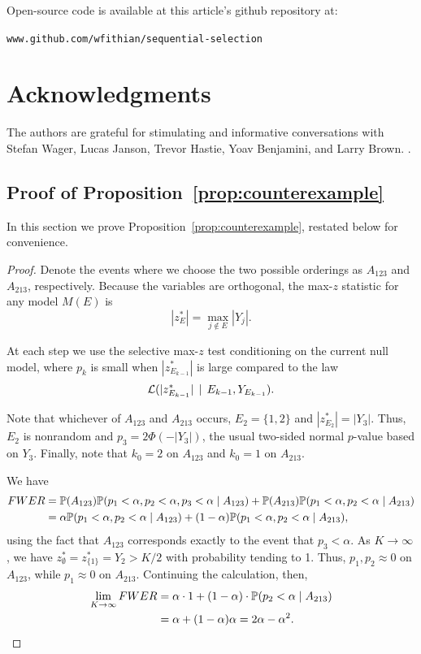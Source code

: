 \documentclass{article}
\begin{document}
Open-source code is available at this article's github repository at:
\begin{center}
\texttt{www.github.com/wfithian/sequential-selection}
\end{center}

\section*{Acknowledgments}

The authors are grateful for stimulating and informative conversations with Stefan Wager, Lucas Janson, Trevor Hastie, Yoav Benjamini, and Larry Brown. .




\newpage

\begin{appendix}

\section{Proof of Proposition~\ref{prop:counterexample}}

In this section we prove Proposition~\ref{prop:counterexample}, restated below for convenience.

\counterex*

\begin{proof}
Denote the events where we choose the two possible orderings as $A_{123}$ and $A_{213}$, respectively. Because the variables are orthogonal, the max-$z$ statistic for any model $M(E)$ is 
\[
|z_E^*|=\max_{j\notin E} |Y_j|.
\]

At each step we use the selective max-$z$ test conditioning on the current null model, where $p_k$ is small when $|z_{E_{k-1}}^*|$ is large compared to the law
\[
\L(|z_{E_{k-1}}^*| \,\mid\, E_{k-1}, Y_{E_{k-1}}).
\]

Note that whichever of $A_{123}$ and $A_{213}$ occurs, $E_2=\{1,2\}$ and $|z_{E_2}^*|=|Y_3|$. Thus, $E_2$ is nonrandom and $p_3=2\Phi(-|Y_3|)$, the usual two-sided normal $p$-value based on $Y_3$. Finally, note that $k_0=2$ on $A_{123}$ and $k_0=1$ on $A_{213}$. 

We have
\begin{align*}
  FWER 
  &= \P(A_{123})\P(p_1<\alpha, p_2<\alpha, p_3<\alpha \mid A_{123})
  + \P(A_{213})\P(p_1<\alpha, p_2<\alpha \mid A_{213})\\
  &= \alpha \P(p_1<\alpha, p_2<\alpha \mid A_{123})
  + (1-\alpha) \P(p_1<\alpha, p_2<\alpha \mid A_{213}),
\end{align*}
using the fact that $A_{123}$ corresponds exactly to the event that $p_3<\alpha$. As $K\to\infty$, we have $z_\emptyset^*=z_{\{1\}}^*=Y_2>K/2$ with probability tending to 1. Thus, $p_1,p_2\approx 0$ on $A_{123}$, while $p_1\approx 0$ on $A_{213}$. Continuing the calculation, then,
\begin{align*}
  \lim_{K\to\infty} FWER 
  &= \alpha\cdot 1 + (1-\alpha)\cdot \P(p_2 < \alpha \mid A_{213})\\
  &= \alpha + (1-\alpha)\alpha = 2\alpha-\alpha^2.
\end{align*}
\end{proof}



\end{appendix}
\end{document}
